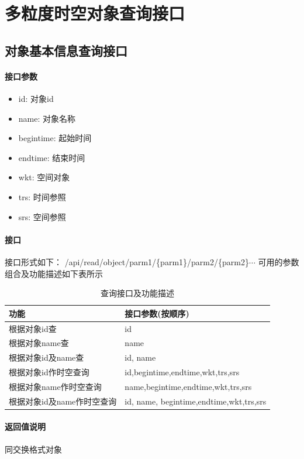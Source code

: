 \documentclass[UTF8, 12pt]{ctexart}
\begin{document}
\section{多粒度时空对象查询接口}
\subsection{对象基本信息查询接口}
	\paragraph{接口参数}
		\begin{itemize}
			\item id: 对象id
			\item name: 对象名称
			\item begintime: 起始时间
			\item endtime: 结束时间
			\item wkt: 空间对象
			\item trs: 时间参照
			\item srs: 空间参照
		\end{itemize}
	\paragraph{接口}
		接口形式如下：
		\newline
		{\color{red}/api/read/object/parm1/\{parm1\}/parm2/\{parm2\}$\cdots$}
		可用的参数组合及功能描述如下表所示
		\begin{table}[H]
			\centering
			\caption{查询接口及功能描述}
			\begin{tabular}{|p{6cm}|p{8cm}|}
				\hline
				功能 & 接口参数(按顺序) \\
				\hline
				根据对象id查 & id \\
				\hline
				根据对象name查 & name \\
				\hline
				根据对象id及name查 & id, name \\
				\hline
				根据对象id作时空查询 & id,begintime,endtime,wkt,trs,srs \\
				\hline
				根据对象name作时空查询 & name,begintime,endtime,wkt,trs,srs \\
				\hline
				根据对象id及name作时空查询 & id, name, begintime,endtime,wkt,trs,srs \\
				\hline
			\end{tabular}
		\end{table}

	\paragraph{返回值说明}
		同交换格式对象
\end{document}
